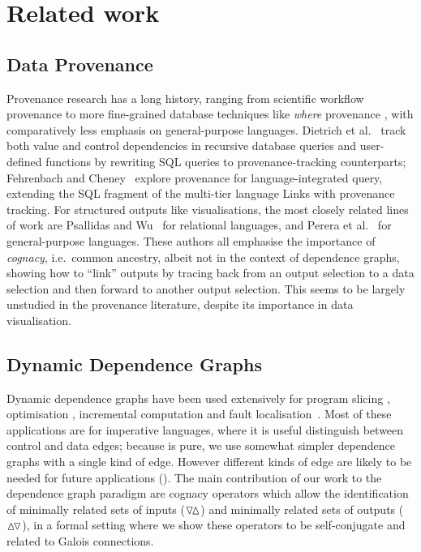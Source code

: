 \section{Related work}
\label{sec:related-work}

\subsection{Data Provenance}

Provenance research has a long history, ranging from scientific workflow provenance
\cite{callahan06,davidson08} to more fine-grained database techniques like \emph{where} provenance
\cite{buneman01}, with comparatively less emphasis on general-purpose languages. Dietrich et
al.~\cite{dietrich22} track both value and control dependencies in recursive database queries and user-defined
functions by rewriting SQL queries to provenance-tracking counterparts; Fehrenbach and
Cheney~\cite{fehrenbach19} explore provenance for language-integrated query, extending the SQL fragment of the
multi-tier language Links \cite{cooper06} with provenance tracking. For structured outputs like
visualisations, the most closely related lines of work are Psallidas and Wu~\cite{psallidas18b} for relational
languages, and Perera et al.~\cite{perera22} for general-purpose languages. These authors all emphasise the
importance of \emph{cognacy}, i.e.~common ancestry, albeit not in the context of dependence graphs, showing
how to ``link'' outputs by tracing back from an output selection to a data selection and then forward to
another output selection. This seems to be largely unstudied in the provenance literature, despite its
importance in data visualisation.

\subsection{Dynamic Dependence Graphs}

Dynamic dependence graphs have been used extensively for program slicing \cite{field98,hammer06}, optimisation
\cite{ferrante87}, incremental computation \cite{acar02} and fault localisation~\cite{Soremekun2021}. Most of
these applications are for imperative languages, where it is useful distinguish between control and data
edges; because \OurLang is pure, we use somewhat simpler dependence graphs with a single kind of edge. However
different kinds of edge are likely to be needed for future applications (). The main
contribution of our work to the dependence graph paradigm are cognacy operators which allow the identification
of minimally related sets of inputs ($\relInputR$) and minimally related sets of outputs ($\relOutputR$), in a
formal setting where we show these operators to be self-conjugate and related to Galois connections.

